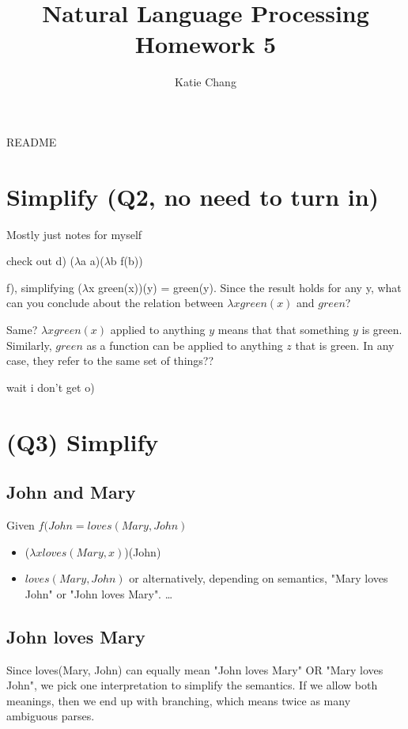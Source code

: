 \documentclass[12pt, letterpaper]{article}
\title{Natural Language Processing Homework 5}
\author{Katie Chang}
\begin{document}
\maketitle

README

\section{Simplify (Q2, no need to turn in)}
Mostly just notes for myself

check out d) ($\lambda$a a)($\lambda$b f(b))

f), simplifying ($\lambda$x green(x))(y) = green(y).
Since the result holds for any y, what can you conclude about the relation between $\lambda x green(x)$ and $green$?

Same? $\lambda x green(x)$ applied to anything $y$ means that that something $y$ is green. Similarly, $green$ as a function can be applied to anything $z$ that is green. In any case, they refer to the same set of things??

wait i don't get o)

\section{(Q3) Simplify}

\subsection{John and Mary}
Given $f(John = loves(Mary, John)$

\begin{itemize}  
\item ($\lambda x loves(Mary,x)$)(John)
\item $loves(Mary, John)$ or alternatively, depending on semantics, "Mary loves John" or "John loves Mary".
\ldots 
\end{itemize}

\subsection{John loves Mary}

Since loves(Mary, John) can equally mean "John loves Mary" OR "Mary loves John", we pick one interpretation to simplify the semantics. If we allow both meanings, then we end up with branching, which means twice as many ambiguous parses. 
\end{document}
